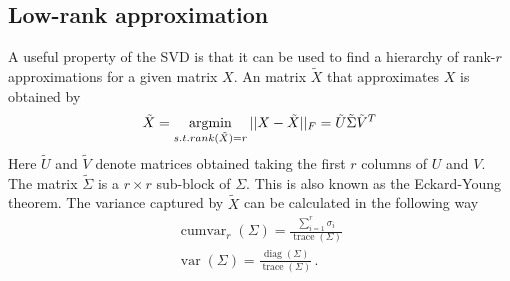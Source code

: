\subsection{Low-rank approximation}
A useful property of the SVD is that it can be used to find a hierarchy of rank-\(r\) approximations for a given matrix \(X\).
An matrix \(\tilde{X}\) that approximates \(X\) is obtained by 
\begin{gather}
\tilde{X} = \operatorname*{argmin}\limits_{s.t. rank(\tilde{X}) = r} 
 ||X - \tilde{X}||_F = \tilde{U}\tilde{\Sigma}\tilde{V}^{T}
\end{gather}	
Here  \(\tilde{U}\) and \(\tilde{V}\) denote matrices obtained taking the first \(r\) columns of \(U\) and \(V\). The matrix \(\tilde{\Sigma}\) is a \(r \times r\) sub-block of \(\Sigma\).
This is also known as the Eckard-Young theorem.
The variance captured by \(\tilde{X}\) can be calculated in the following way \cite{brunton_kutz_2019b}
\begin{gather}
\operatorname{cumvar}_{r}(\Sigma) = \frac{\sum_{i = 1}^{r} \sigma_i}{\operatorname{trace}(\Sigma)} \label{cum-var-r} \\
\operatorname{var}(\Sigma) = \frac{\operatorname{diag}(\Sigma)}{\operatorname{trace}(\Sigma)} \,. \label{var-sig}
\end{gather}

